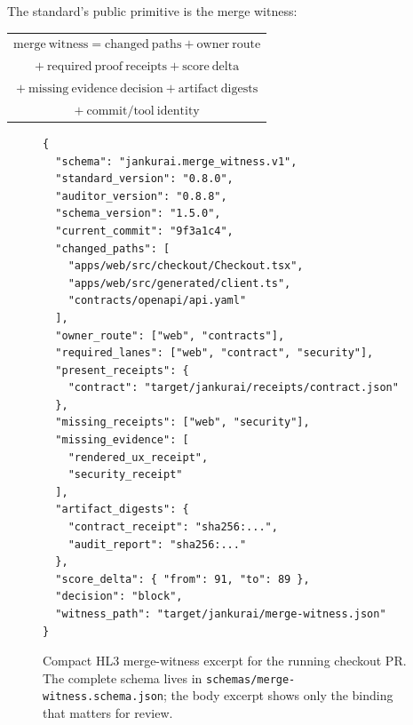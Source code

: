 The standard's public primitive is the merge witness:
\begin{center}
\small
\begin{tabular}{c}
\(\mathrm{merge\ witness}=\mathrm{changed\ paths}+\mathrm{owner\ route}\) \\
\(+\ \mathrm{required\ proof\ receipts}+\mathrm{score\ delta}\) \\
\(+\ \mathrm{missing\ evidence\ decision}+\mathrm{artifact\ digests}\) \\
\(+\ \mathrm{commit/tool\ identity}\)
\end{tabular}
\end{center}

\begin{figure}[t]
\centering
\begin{minipage}{0.92\textwidth}
\begin{lstlisting}[style=codebox]
{
  "schema": "jankurai.merge_witness.v1",
  "standard_version": "0.8.0",
  "auditor_version": "0.8.8",
  "schema_version": "1.5.0",
  "current_commit": "9f3a1c4",
  "changed_paths": [
    "apps/web/src/checkout/Checkout.tsx",
    "apps/web/src/generated/client.ts",
    "contracts/openapi/api.yaml"
  ],
  "owner_route": ["web", "contracts"],
  "required_lanes": ["web", "contract", "security"],
  "present_receipts": {
    "contract": "target/jankurai/receipts/contract.json"
  },
  "missing_receipts": ["web", "security"],
  "missing_evidence": [
    "rendered_ux_receipt",
    "security_receipt"
  ],
  "artifact_digests": {
    "contract_receipt": "sha256:...",
    "audit_report": "sha256:..."
  },
  "score_delta": { "from": 91, "to": 89 },
  "decision": "block",
  "witness_path": "target/jankurai/merge-witness.json"
}
\end{lstlisting}
\end{minipage}
\caption{Compact HL3 merge-witness excerpt for the running checkout PR. The complete schema lives in \texttt{schemas/merge-witness.schema.json}; the body excerpt shows only the binding that matters for review.}
\label{fig:merge-witness-excerpt}
\end{figure}

